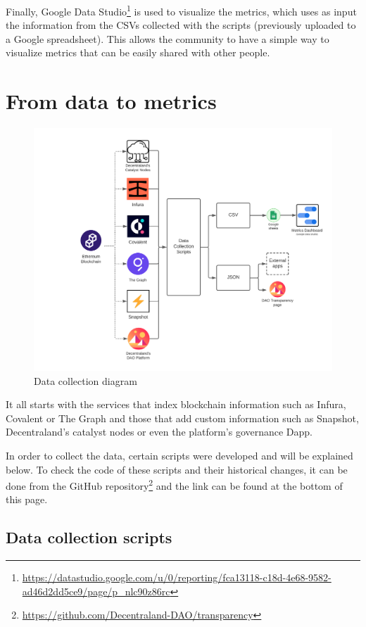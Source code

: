 \documentclass[MSE,Master,english]{twbook}%
\begin{document}
Finally, Google Data Studio\footnote{\url{https://datastudio.google.com/u/0/reporting/fca13118-c18d-4e68-9582-ad46d2dd5ce9/page/p_nlc90z86rc}} is used to visualize the metrics, which uses as input the information from the CSVs collected with the scripts (previously uploaded to a Google spreadsheet). This allows the community to have a simple way to visualize metrics that can be easily shared with other people.

\section{From data to metrics}
\begin{figure}[H]
  \centering
  \includegraphics[width=\textwidth]{diagrama.png}
  \caption{Data collection diagram}
  \label{fig:diagram}
\end{figure}

It all starts with the services that index blockchain information such as Infura, Covalent or The Graph and those that add custom information such as Snapshot, Decentraland's catalyst nodes or even the platform's governance Dapp.

In order to collect the data, certain scripts were developed and will be explained below. To check the code of these scripts and their historical changes, it can be done from the GitHub repository\footnote{\url{https://github.com/Decentraland-DAO/transparency}} and the link can be found at the bottom of this page.

\subsection{Data collection scripts}
\end{document}
